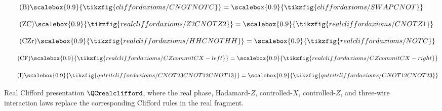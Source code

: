 \begin{figure}[ht]
{\begin{minipage}{0.975\linewidth}
\begin{minipage}[c]{0.29\linewidth}
            \begin{equation}\tag{B}\label{realB}
                \scalebox{0.9}{\tikzfig{cliffordaxioms/CNOTNOTC}} = \scalebox{0.9}{\tikzfig{cliffordaxioms/SWAPCNOT}}
            \end{equation}
        \end{minipage}
        \begin{minipage}[c]{0.35\linewidth}\centering
            \begin{equation}\tag{ZC}\label{realwC}
                \scalebox{0.9}{\tikzfig{realcliffordaxioms/Z2CNOTZ2}} = \scalebox{0.9}{\tikzfig{realcliffordaxioms/CNOTZ1}}
            \end{equation}
        \end{minipage}\vspace{-0.6em}
        \begin{minipage}[c]{0.32\linewidth}\centering
            \begin{equation}\tag{CZr}\label{realXC}
                \scalebox{0.9}{\tikzfig{realcliffordaxioms/HHCNOTHH}} = \scalebox{0.9}{\tikzfig{realcliffordaxioms/NOTC}}
            \end{equation}
        \end{minipage}
        \begin{minipage}[c]{0.57\linewidth}\centering
            \begin{equation}\tag{CF}\label{realCF}
                \scalebox{0.9}{\tikzfig{realcliffordaxioms/CZcommitCX-left}} = \scalebox{0.9}{\tikzfig{realcliffordaxioms/CZcommitCX-right}}
            \end{equation}
        \end{minipage}
        \begin{minipage}[c]{0.29\linewidth}\centering
            \begin{equation}\tag{I}\label{realInew}
                \scalebox{0.9}{\tikzfig{qutritcliffordaxioms/CNOT23CNOT12CNOT13}} = \scalebox{0.9}{\tikzfig{qutritcliffordaxioms/CNOT12CNOT23}}
            \end{equation}
        \end{minipage}
    \end{minipage}}
    \caption{Real Clifford presentation \(\QCrealclifford\), where the real phase, Hadamard-\(Z\), controlled-\(X\), controlled-\(Z\), and three-wire interaction laws replace the corresponding Clifford rules in the real fragment.}
    \label{fig:qubitrealcliffordaxioms}
\end{figure}
